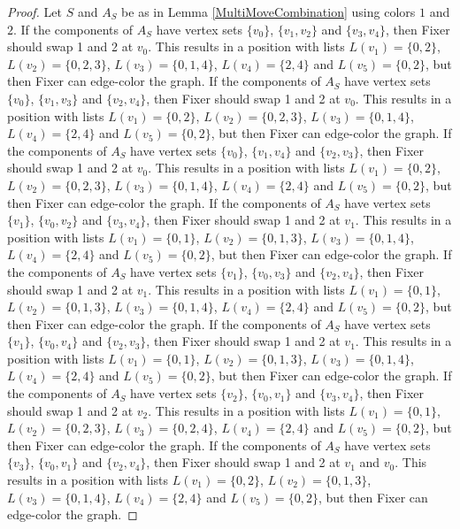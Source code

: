 \documentclass[12pt]{amsart}
\theoremstyle{plain}
\theoremstyle{definition}
\theoremstyle{remark}
\begin{document}
\begin{proof}
Let $S$ and $A_S$ be as in Lemma \ref{MultiMoveCombination} using colors $1$ and $2$. If the components of $A_S$ have vertex sets $\{v_0\}$, $\{v_1, v_2\}$ and $\{v_3, v_4\}$, then Fixer should swap 1 and 2 at $v_0$. This results in a position with lists $L(v_1) = \{0, 2\}$, $L(v_2) = \{0, 2, 3\}$, $L(v_3) = \{0, 1, 4\}$, $L(v_4) = \{2, 4\}$ and $L(v_5) = \{0, 2\}$, but then Fixer can edge-color the graph.
If the components of $A_S$ have vertex sets $\{v_0\}$, $\{v_1, v_3\}$ and $\{v_2, v_4\}$, then Fixer should swap 1 and 2 at $v_0$. This results in a position with lists $L(v_1) = \{0, 2\}$, $L(v_2) = \{0, 2, 3\}$, $L(v_3) = \{0, 1, 4\}$, $L(v_4) = \{2, 4\}$ and $L(v_5) = \{0, 2\}$, but then Fixer can edge-color the graph.
If the components of $A_S$ have vertex sets $\{v_0\}$, $\{v_1, v_4\}$ and $\{v_2, v_3\}$, then Fixer should swap 1 and 2 at $v_0$. This results in a position with lists $L(v_1) = \{0, 2\}$, $L(v_2) = \{0, 2, 3\}$, $L(v_3) = \{0, 1, 4\}$, $L(v_4) = \{2, 4\}$ and $L(v_5) = \{0, 2\}$, but then Fixer can edge-color the graph.
If the components of $A_S$ have vertex sets $\{v_1\}$, $\{v_0, v_2\}$ and $\{v_3, v_4\}$, then Fixer should swap 1 and 2 at $v_1$. This results in a position with lists $L(v_1) = \{0, 1\}$, $L(v_2) = \{0, 1, 3\}$, $L(v_3) = \{0, 1, 4\}$, $L(v_4) = \{2, 4\}$ and $L(v_5) = \{0, 2\}$, but then Fixer can edge-color the graph.
If the components of $A_S$ have vertex sets $\{v_1\}$, $\{v_0, v_3\}$ and $\{v_2, v_4\}$, then Fixer should swap 1 and 2 at $v_1$. This results in a position with lists $L(v_1) = \{0, 1\}$, $L(v_2) = \{0, 1, 3\}$, $L(v_3) = \{0, 1, 4\}$, $L(v_4) = \{2, 4\}$ and $L(v_5) = \{0, 2\}$, but then Fixer can edge-color the graph.
If the components of $A_S$ have vertex sets $\{v_1\}$, $\{v_0, v_4\}$ and $\{v_2, v_3\}$, then Fixer should swap 1 and 2 at $v_1$. This results in a position with lists $L(v_1) = \{0, 1\}$, $L(v_2) = \{0, 1, 3\}$, $L(v_3) = \{0, 1, 4\}$, $L(v_4) = \{2, 4\}$ and $L(v_5) = \{0, 2\}$, but then Fixer can edge-color the graph.
If the components of $A_S$ have vertex sets $\{v_2\}$, $\{v_0, v_1\}$ and $\{v_3, v_4\}$, then Fixer should swap 1 and 2 at $v_2$. This results in a position with lists $L(v_1) = \{0, 1\}$, $L(v_2) = \{0, 2, 3\}$, $L(v_3) = \{0, 2, 4\}$, $L(v_4) = \{2, 4\}$ and $L(v_5) = \{0, 2\}$, but then Fixer can edge-color the graph.
If the components of $A_S$ have vertex sets $\{v_3\}$, $\{v_0, v_1\}$ and $\{v_2, v_4\}$, then Fixer should swap 1 and 2 at $v_1$ and $v_0$. This results in a position with lists $L(v_1) = \{0, 2\}$, $L(v_2) = \{0, 1, 3\}$, $L(v_3) = \{0, 1, 4\}$, $L(v_4) = \{2, 4\}$ and $L(v_5) = \{0, 2\}$, but then Fixer can edge-color the graph.

\end{proof}
\end{document}
